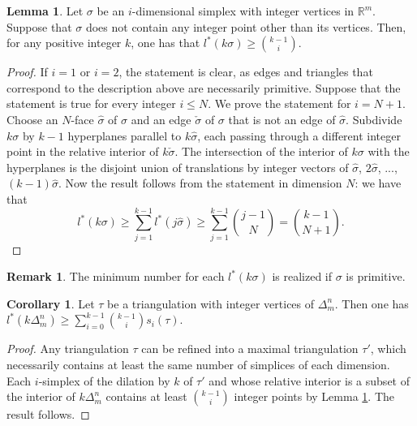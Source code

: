 \documentclass[12pt]{article}
\theoremstyle{definition}
\newtheorem{lem}{Lemma}[section]
\newtheorem{cor}{Corollary}[section]
\newtheorem{rmk}{Remark}[section]
\begin{document}
\begin{lem}
    \label{lem_maximal_simplices}
    Let $\sigma$ be an $i$-dimensional simplex with integer vertices in $\mathbb{R}^m$. Suppose that $\sigma$ does not contain any integer point other than its vertices. Then, for any positive integer $k$, one has that $l^*(k \sigma) \geq {k-1 \choose i}$.
\end{lem}

\begin{proof}
    If $i=1$ or $i=2$, the statement is clear, as edges and triangles that correspond to the description above are necessarily primitive. Suppose that the statement is true for every integer $i \leq N$. We prove the statement for $i = N+1$. Choose an $N$-face $\hat{\sigma}$ of $\sigma$ and an edge $\check{\sigma}$ of $\sigma$ that is not an edge of $\hat{\sigma}$. Subdivide $k\sigma$ by $k-1$ hyperplanes parallel to $k\hat{\sigma}$, each passing through a different integer point in the relative interior of $k\check{\sigma}$. The intersection of the interior of $k\sigma$ with the hyperplanes is the disjoint union of translations by integer vectors of $\hat{\sigma}$, $2\hat{\sigma}$, ..., $(k-1)\hat{\sigma}$. Now the result follows from the statement in dimension $N$: we have that 
    \begin{equation*}
        l^*(k\sigma) \geq \sum_{j=1}^{k-1} l^*(j \hat{\sigma}) \geq \sum_{j=1}^{k-1} {j-1 \choose N} = {k-1 \choose N+1}.    
    \end{equation*}
\end{proof}

\begin{rmk}
    The minimum number for each $l^*(k \sigma)$ is realized if $\sigma$ is primitive.
\end{rmk}

\begin{cor}
    \label{corollary_number_simplices_number_points}
    Let $\tau$ be a triangulation with integer vertices of $\Delta_m^n$. Then one has $l^*(k\Delta_m^n) \geq \sum_{i=0}^{k-1} {k-1 \choose i} s_i(\tau)$.
\end{cor}

\begin{proof}
    Any triangulation $\tau$ can be refined into a maximal triangulation $\tau'$, which necessarily contains at least the same number of simplices of each dimension. Each $i$-simplex of the dilation by $k$ of $\tau'$ and whose relative interior is a subset of the interior of $k\Delta_m^n$ contains at least ${k-1 \choose i}$ integer points by Lemma \ref{lem_maximal_simplices}. The result follows.
\end{proof}
\end{document}
